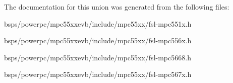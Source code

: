 The documentation for this union was generated from the following files\+:\begin{DoxyCompactItemize}
\item 
bsps/powerpc/mpc55xxevb/include/mpc55xx/fsl-\/mpc551x.\+h\item 
bsps/powerpc/mpc55xxevb/include/mpc55xx/fsl-\/mpc556x.\+h\item 
bsps/powerpc/mpc55xxevb/include/mpc55xx/fsl-\/mpc5668.\+h\item 
bsps/powerpc/mpc55xxevb/include/mpc55xx/fsl-\/mpc567x.\+h\end{DoxyCompactItemize}
